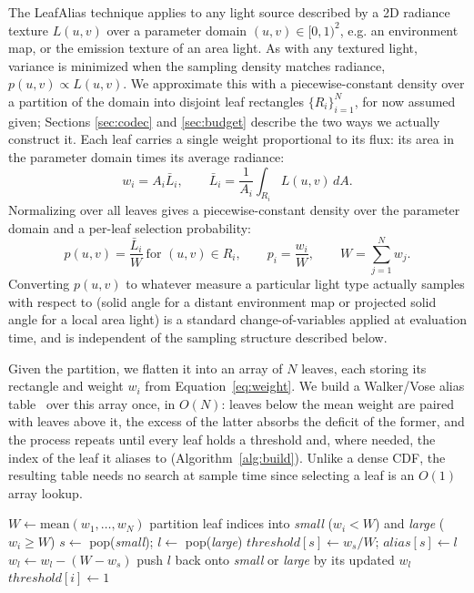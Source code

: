 \documentclass[acmtog,review,anonymous]{acmart}
\begin{document}
The LeafAlias technique applies to any light source described by a 2D radiance texture $L(u,v)$ over
a parameter domain $(u,v)\in[0,1)^2$, e.g. an environment map, or the emission texture of an
area light. As with any textured light, variance is minimized when the sampling density
matches radiance, $p(u,v)\propto L(u,v)$. We approximate this with a piecewise-constant density
over a partition of the domain into disjoint leaf rectangles $\{R_i\}_{i=1}^N$, for now
assumed given; Sections \ref{sec:codec} and \ref{sec:budget} describe the two ways we
actually construct it. Each leaf carries a single weight proportional to its flux: its area in the parameter domain
times its average radiance:
\begin{equation}
w_i = A_i \bar{L}_i, \qquad \bar{L}_i = \frac{1}{A_i}\int_{R_i} L(u,v)\,dA. \label{eq:weight}
\end{equation}
Normalizing over all leaves gives a piecewise-constant density over the parameter domain
and a per-leaf selection probability:
\begin{equation}
p(u,v) = \frac{\bar{L}_i}{W} \ \text{for } (u,v) \in R_i, \qquad
p_i = \frac{w_i}{W}, \qquad W = \sum_{j=1}^N w_j. \label{eq:pdf}
\end{equation}
Converting $p(u,v)$ to whatever measure a particular light type actually samples with
respect to (solid angle for a distant environment map or projected solid angle for a local
area light) is a standard change-of-variables applied at evaluation time, and is
independent of the sampling structure described below.

Given the partition, we flatten it into an array of $N$ leaves, each storing its rectangle
and weight $w_i$ from Equation~\ref{eq:weight}. We build a Walker/Vose alias
table~\cite{vose1991linear} over this array once, in $O(N)$: leaves below the mean weight
are paired with leaves above it, the excess of the latter absorbs the deficit of the
former, and the process repeats until every leaf holds a threshold and, where needed, the
index of the leaf it aliases to (Algorithm~\ref{alg:build}). Unlike a dense CDF, the
resulting table needs no search at sample time since selecting a leaf is an $O(1)$ array
lookup.

\begin{algorithm}[h]
\caption{Build the alias table over $N$ leaves}
\label{alg:build}
\begin{algorithmic}[1]
\STATE $W \leftarrow \text{mean}(w_1,\dots,w_N)$
\STATE partition leaf indices into \textit{small} ($w_i < W$) and \textit{large} ($w_i \geq W$)
  \STATE $s \leftarrow$ pop(\textit{small}); \quad $l \leftarrow$ pop(\textit{large})
  \STATE $\mathit{threshold}[s] \leftarrow w_s / W$; \quad $\mathit{alias}[s] \leftarrow l$
  \STATE $w_l \leftarrow w_l - (W - w_s)$ 
  \STATE push $l$ back onto \textit{small} or \textit{large} by its updated $w_l$
\ENDWHILE
{}
  \STATE $\mathit{threshold}[i] \leftarrow 1$
\ENDFOR
\end{algorithmic}
\end{algorithm}
\end{document}
